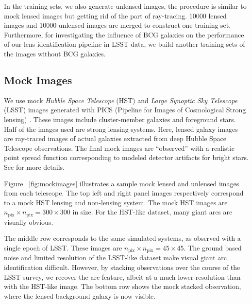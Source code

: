 \documentclass{emulateapj}
\begin{document}
In the training sets, we also generate unlensed images, the procedure
is similar to mock lensed images but getting rid of the part of
ray-tracing. 10000 lensed images and 10000 unlensed images are merged
to construct one training set. Furthermore, for investigating the
influence of BCG galaxies on the performance of our lens
identification pipeline in LSST data, we build another training sets
of the images without BCG galaxies.

\subsection{Mock Images}

We use mock {\em Hubble Space Telescope} (HST) and {\em Large Synoptic
  Sky Telescope} (LSST) images generated with PICS (Pipeline for
Images of Cosmological Strong lensing) \citep{li_etal16}.  These
images include cluster-member galaxies and foreground stars.  Half of
the images used are strong lensing systems.  Here, lensed galaxy
images are ray-traced images of actual galaxies extracted from deep
Hubble Space Telescope observations.  The final mock images are
``observed'' with a realistic point spread function corresponding to
modeled detector artifacts for bright stars.  See \cite{li_etal16} for
more details.

Figure ~\ref{fig:mockimages} illustrates a sample mock lensed and
unlensed images from each telescope.  The top left and right panel
images respectively correspond to a mock HST lensing and non-lensing
system. The mock HST images are $n_\text{pix}\times
n_\text{pix}=300\times300$ in size.  For the HST-like dataset, many
giant arcs are visually obvious.

The middle row corresponds to the same simulated systems, as observed
with a single epoch of LSST.  These images are $n_\text{pix}\times
n_\text{pix}=45\times45$.  The ground based noise and limited
resolution of the LSST-like dataset make visual giant arc
identification difficult.  However, by stacking observations over the
course of the LSST survey, we recover the arc feature, albeit at a
much lower resolution than with the HST-like image. The bottom row
shows the mock stacked observation, where the lensed background galaxy
is now visible.
\end{document}
